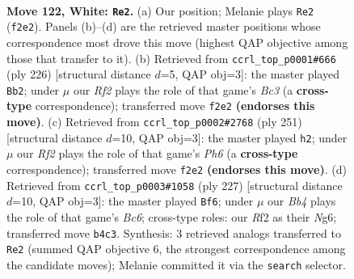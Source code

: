 \documentclass[11pt]{article}
\begin{document}
\clearpage

\begin{figure}[p]\centering
\begin{subfigure}{0.46\textwidth}\centering
\resizebox{\linewidth}{!}{%
\newchessgame
\chessboard[
  setfen={6k1/8/7r/K7/1B6/8/5R2/8 w - - 11 122},
  showmover=false,
  pgfstyle=straightmove, color=movearrow, markmove={f2-e2}
]}
\caption{}
\end{subfigure}\hfill
\begin{subfigure}{0.46\textwidth}\centering
\resizebox{\linewidth}{!}{%
\newchessgame
\chessboard[
  setfen={8/8/8/3k4/8/2B2K2/4B3/8 w - - 5 114},
  showmover=false,
  pgfstyle=straightmove, color=movearrow, markmove={c3-b2}
]}
\caption{}
\end{subfigure}
\\[4pt]
\begin{subfigure}{0.46\textwidth}\centering
\resizebox{\linewidth}{!}{%
\newchessgame
\chessboard[
  setfen={7R/8/8/8/8/5b1p/3K2k1/8 b - - 4 126},
  showmover=false,
  pgfstyle=straightmove, color=movearrow, markmove={h3-h2}
]}
\caption{}
\end{subfigure}\hfill
\begin{subfigure}{0.46\textwidth}\centering
\resizebox{\linewidth}{!}{%
\newchessgame
\chessboard[
  setfen={8/2R5/6n1/3K4/6B1/2b5/1k6/8 b - - 68 114},
  showmover=false,
  pgfstyle=straightmove, color=movearrow, markmove={c3-f6}
]}
\caption{}
\end{subfigure}
\caption{\textbf{Move 122, White: \texttt{Re2}.} (a) Our position; Melanie plays \texttt{Re2} (\texttt{f2e2}). Panels (b)--(d) are the retrieved master positions whose correspondence most drove this move (highest QAP objective among those that transfer to it). (b) Retrieved from \texttt{ccrl\_top\_p0001\#666} (ply 226) [structural distance $d$=5, QAP obj=3]: the master played \texttt{Bb2}; under $\mu$ our \emph{Rf2} plays the role of that game's \emph{Bc3} (a \textbf{cross-type} correspondence); transferred move \texttt{f2e2} \textbf{(endorses this move)}. (c) Retrieved from \texttt{ccrl\_top\_p0002\#2768} (ply 251) [structural distance $d$=10, QAP obj=3]: the master played \texttt{h2}; under $\mu$ our \emph{Rf2} plays the role of that game's \emph{Ph6} (a \textbf{cross-type} correspondence); transferred move \texttt{f2e2} \textbf{(endorses this move)}. (d) Retrieved from \texttt{ccrl\_top\_p0003\#1058} (ply 227) [structural distance $d$=10, QAP obj=3]: the master played \texttt{Bf6}; under $\mu$ our \emph{Bb4} plays the role of that game's \emph{Bc6}; cross-type roles: our \emph{R}f2 as their \emph{N}g6; transferred move \texttt{b4c3}. Synthesis: 3 retrieved analogs transferred to \texttt{Re2} (summed QAP objective 6, the strongest correspondence among the candidate moves); Melanie committed it via the \texttt{search} selector.}
\label{fig:thought-m242}
\end{figure}
\end{document}
